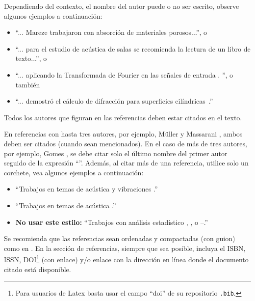 Dependiendo del contexto, el nombre del autor puede o no ser escrito, observe algunos ejemplos a continuación:
%
\begin{itemize}[noitemsep,topsep=0ex] \itemsep=4pt
	\item 	``... Mareze \etal \cite{Mareze-2019} trabajaron con absorción de materiales porosos...'', o 
	
	\item ``... para el estudio de acústica de salas \cite{Brandao-2017} se recomienda la lectura de un libro de texto...'', o
	\item ``... aplicando la Transformada de Fourier en las señales de entrada \cite{Oppenheim-2010}. '', o también
	\item ``...  demostró el cálculo de difracción para superficies cilíndricas~\cite{Fonseca-2013}.''
\end{itemize}
%
Todos los autores que figuran en las referencias deben estar citados en el texto.

En referencias con hasta tres autores, por ejemplo, Müller y Massarani \cite{Muller-2001}, ambos deben ser citados (cuando sean mencionados). En el caso de más de tres autores, por ejemplo, Gomes \etal \cite{Gomes-2015}, se debe citar solo el último nombre del primer autor seguido de la expresión ``\etal''. Además, al citar más de una referencia, utilice solo un corchete, vea algunos ejemplos a continuación:
%
\begin{itemize}[noitemsep,topsep=0ex] \itemsep=8pt
	\item ``Trabajos en temas de acústica y vibraciones \cite{Mareze-2017,Fonseca-2013,Brandao-2017}.''
	\item ``Trabajos en temas de acústica \cite{Mareze-2017,Oppenheim-2010,Muller-2001, Mareze-2019, jasa:2022eac}.''
	\item \textbf{No usar este estilo:} ``Trabajos con análisis estadístico \cite{Mareze-2017}, \cite{Brandao-2017}, \cite{jasa:2022eac} o \cite{Mareze-2017}--\cite{jasa:2022eac}.''
\end{itemize}
%
Se recomienda que las referencias sean ordenadas y compactadas (con guion) como en \cite{Mareze-2017,Oppenheim-2010,Muller-2001,Mareze-2019}.
%
En la sección de referencias, siempre que sea posible, incluya el ISBN, ISSN, DOI\footnote{Para usuarios de Latex basta usar el campo ``doi'' de su repositorio \texttt{.bib}.} (con enlace) y/o enlace con la dirección en línea donde el documento citado está disponible.

